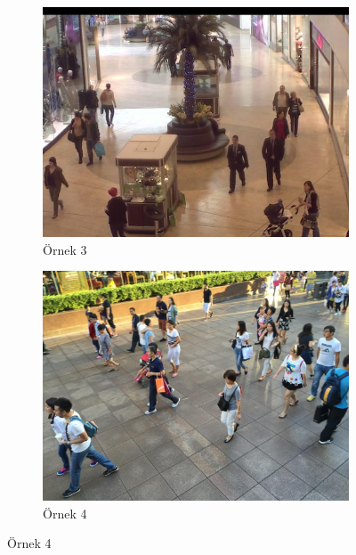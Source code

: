 \documentclass[10pt,a4paper]{report}
\begin{document}
	
		\begin{figure}[!h]
				\begin{subfigure}{\textwidth}
			\raggedright
			\includegraphics[width=\textwidth]{ornek3.jpg}
			\caption{Örnek 3}
			\label{Ornek3}
		\end{subfigure}
		\begin{subfigure}{\textwidth}
			\raggedright
			\includegraphics[width=\textwidth]{ornek4.jpg}
			\caption{Örnek 4}
			\label{Ornek4}
		\end{subfigure}
	\end{figure}
\end{document}
